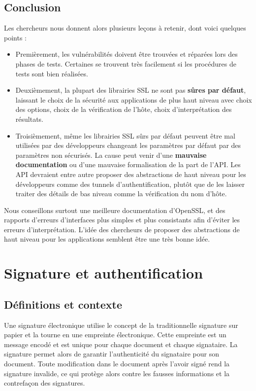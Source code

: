 \subsection{Conclusion}

Les chercheurs nous donnent alors plusieurs leçons à retenir, dont voici quelques points :
\begin{itemize}
\item Premièrement, les vulnérabilités doivent être trouvées et réparées lors des phases de tests. Certaines se trouvent très facilement si les procédures de tests sont bien réalisées.
\item Deuxièmement, la plupart des librairies SSL ne sont pas \textbf{sûres par défaut}, laissant le choix de la sécurité aux applications de plus haut niveau avec choix des options, choix de la vérification de l'hôte, choix d'interprétation des résultats.
\item Troisièmement, même les librairies SSL sûrs par défaut peuvent être mal utilisées par des développeurs changeant les paramètres par défaut par des paramètres non sécurisés. La cause peut venir d'une \textbf{mauvaise documentation} ou d'une mauvaise formalisation de la part de l'API. Les API devraient entre autre proposer des abstractions de haut niveau pour les développeurs comme des tunnels d'authentification, plutôt que de les laisser traiter des détails de bas niveau comme la vérification du nom d'hôte.\\
\end{itemize}

Nous conseillons surtout une meilleure documentation d'OpenSSL, et des rapports d'erreurs d'interfaces plus simples et plus consistants afin d'éviter les erreurs d'interprétation. L'idée des chercheurs de proposer des abstractions de haut niveau pour les applications semblent être une très bonne idée.


\section{Signature et authentification}

\subsection{Définitions et contexte}

Une signature électronique utilise le concept de la traditionnelle signature sur papier et la tourne en une empreinte électronique. Cette empreinte est un message encodé et est unique pour chaque document et chaque signataire. La signature permet alors de garantir l'authenticité du signataire pour son document. Toute modification dans le document après l'avoir signé rend la signature invalide, ce qui protège alors contre les fausses informations et la contrefaçon des signatures.\\

